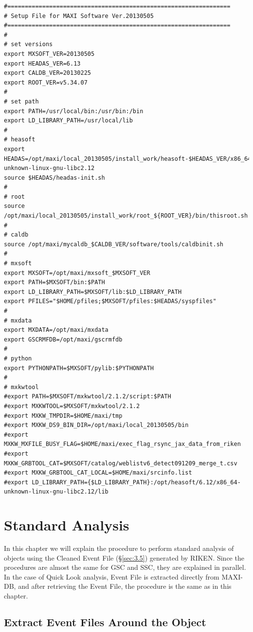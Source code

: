 \documentclass[10pt]{report}
\renewcommand{\_}{\textscale{.5}{\textbf{\textunderscore}}}
\begin{document}
\begin{lstlisting}[basicstyle=\ttfamily\small]
#================================================================
# Setup File for MAXI Software Ver.20130505
#================================================================
#
# set versions
export MXSOFT_VER=20130505
export HEADAS_VER=6.13
export CALDB_VER=20130225
export ROOT_VER=v5.34.07
#
# set path
export PATH=/usr/local/bin:/usr/bin:/bin
export LD_LIBRARY_PATH=/usr/local/lib
#
# heasoft
export HEADAS=/opt/maxi/local_20130505/install_work/heasoft-$HEADAS_VER/x86_64-unknown-linux-gnu-libc2.12
source $HEADAS/headas-init.sh
#
# root
source /opt/maxi/local_20130505/install_work/root_${ROOT_VER}/bin/thisroot.sh
#
# caldb
source /opt/maxi/mycaldb_$CALDB_VER/software/tools/caldbinit.sh
#
# mxsoft
export MXSOFT=/opt/maxi/mxsoft_$MXSOFT_VER
export PATH=$MXSOFT/bin:$PATH
export LD_LIBRARY_PATH=$MXSOFT/lib:$LD_LIBRARY_PATH
export PFILES="$HOME/pfiles;$MXSOFT/pfiles:$HEADAS/syspfiles"
#
# mxdata
export MXDATA=/opt/maxi/mxdata
export GSCRMFDB=/opt/maxi/gscrmfdb
#
# python
export PYTHONPATH=$MXSOFT/pylib:$PYTHONPATH
#
# mxkwtool
#export PATH=$MXSOFT/mxkwtool/2.1.2/script:$PATH
#export MXKWTOOL=$MXSOFT/mxkwtool/2.1.2
#export MXKW_TMPDIR=$HOME/maxi/tmp
#export MXKW_DS9_BIN_DIR=/opt/maxi/local_20130505/bin
#export MXKW_MXFILE_BUSY_FLAG=$HOME/maxi/exec_flag_rsync_jax_data_from_riken
#export MXKW_GRBTOOL_CAT=$MXSOFT/catalog/weblistv6_detect091209_merge_t.csv
#export MXKW_GRBTOOL_CAT_LOCAL=$HOME/maxi/srcinfo.list
#export LD_LIBRARY_PATH={$LD_LIBRARY_PATH}:/opt/heasoft/6.12/x86_64-unknown-linux-gnu-libc2.12/lib
\end{lstlisting}

\clearpage

\chapter{Standard Analysis}\label{ch:4}

In this chapter we will explain the procedure to perform standard analysis of objects using the Cleaned Event File (\S\ref{sec:3.5}) generated by RIKEN. Since the procedures are almost the same for GSC and SSC, they are explained in parallel. In the case of Quick Look analysis, Event File is extracted directly from MAXI-DB, and after retrieving the Event File, the procedure is the same as in this chapter. \\

\section{Extract Event Files Around the Object}\label{sec:4.1}
\end{document}
